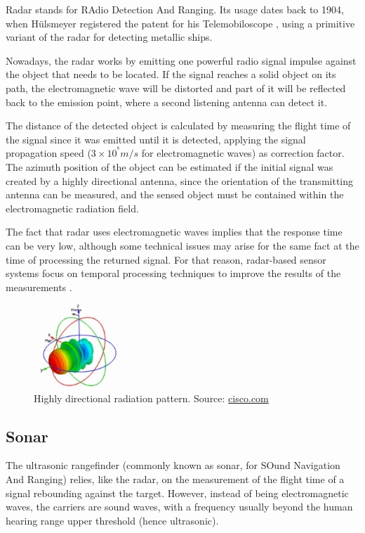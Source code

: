 Radar stands for RAdio Detection And Ranging.
Its usage dates back to 1904, when H\"ulsmeyer registered the patent for his Telemobiloscope \cite{hulsmeyer1904}, using a primitive variant of the radar for detecting metallic ships.

Nowadays, the radar works by emitting one powerful radio signal impulse against the object that needs to be located.
If the signal reaches a solid object on its path, the electromagnetic wave will be distorted and part of it will be reflected back to the emission point, where a second listening antenna can detect it.

The distance of the detected object is calculated by measuring the flight time of the signal since it was emitted until it is detected, applying the signal propagation speed ($3 \times 10^{^8} m/s$ for electromagnetic waves) as correction factor.
The azimuth position of the object can be estimated if the initial signal was created by a highly directional antenna, since the orientation of the transmitting antenna can be measured, and the sensed object must be contained within the electromagnetic radiation field.

The fact that radar uses electromagnetic waves implies that the response time can be very low, although some technical issues may arise for the same fact at the time of processing the returned signal.
For that reason, radar-based sensor systems focus on temporal processing techniques to improve the results of the measurements \cite{krolik2005}.

\begin{figure}[htbp]
	\centering
	\includegraphics[width=0.3\textwidth]{./figures/antennaPattern.jpg}
	\caption{Highly directional radiation pattern. {\footnotesize Source: \url{cisco.com}}}
	\label{fig:antenna}
\end{figure}

\subsection{Sonar}

The ultrasonic rangefinder (commonly known as sonar, for SOund Navigation And Ranging) relies, like the radar, on the measurement of the flight time of a signal rebounding against the target.
However, instead of being electromagnetic waves, the carriers are sound waves, with a frequency usually beyond the human hearing range upper threshold (hence ultrasonic).

